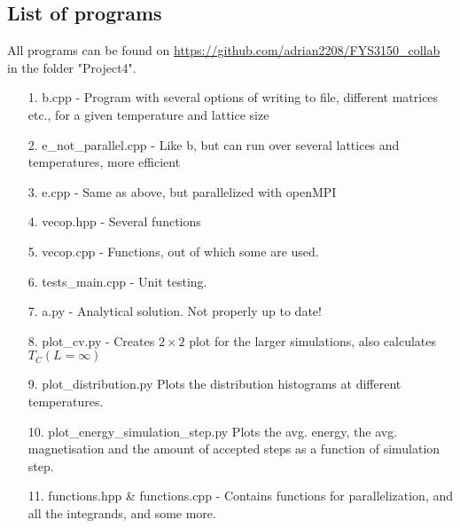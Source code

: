 \documentclass[10pt,a4paper]{article}
\begin{document}
\subsection{List of programs}
All programs can be found on \url{https://github.com/adrian2208/FYS3150_collab} in the folder "Project4".


\begin{itemize}
\item[1.] b.cpp - Program with several options of writing to file, different matrices etc., for a given temperature and lattice size
\item[2.] e\_not\_parallel.cpp - Like b, but can run over several lattices and temperatures, more efficient
\item[3.] e.cpp - Same as above, but parallelized with openMPI
\item[4.] vecop.hpp - Several functions
\item[5.] vecop.cpp - Functions, out of which some are used.
\item[6.] tests\_main.cpp - Unit testing.
\item[7.] a.py - Analytical solution. Not properly up to date!
\item[8.] plot\_cv.py - Creates $2\times2$ plot for the larger simulations, also calculates $T_C(L=\infty)$
\item[9.] plot\_distribution.py Plots the distribution histograms at different temperatures.
\item[10.] plot\_energy\_simulation\_step.py Plots the  avg. energy, the avg. magnetisation and the amount of accepted steps as a function of simulation step.
\item[11.] functions.hpp \& functions.cpp - Contains functions for parallelization, and all the integrands, and some more.
\end{itemize}









\begin{comment}

$$
\begin{bmatrix}
0 & 0 & 0 & 0 \\
0 & 0 & 0 & 0 \\
0 & 0 & 0 & 0 \\
0 & 0 & 0 & 0 \\
\end{bmatrix}
$$

\begin{lstlisting}[caption=insert caption]
for (unsigned int i = 0; i<100;i++{
}
\end{lstlisting}

\begin{figure}[h]
\texttt{[image: ]}
\caption{include caption}
\end{figure}

\end{comment}
\end{document}
